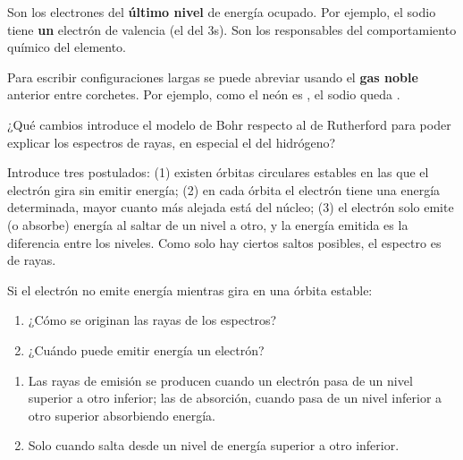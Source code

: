 \begin{definition}
    Son los electrones del \textbf{último nivel} de energía ocupado. Por ejemplo, el sodio tiene \textbf{un} electrón de valencia (el del 3s). Son los responsables del comportamiento químico del elemento.
\end{definition}

\begin{remark}
    Para escribir configuraciones largas se puede abreviar usando el \textbf{gas noble} anterior entre corchetes. Por ejemplo, como el neón es , el sodio queda .
\end{remark}

\begin{exercise}
    ¿Qué cambios introduce el modelo de Bohr respecto al de Rutherford para poder explicar los espectros de rayas, en especial el del hidrógeno?
    \begin{solu}
        Introduce tres postulados: (1) existen órbitas circulares estables en las que el electrón gira sin emitir energía; (2) en cada órbita el electrón tiene una energía determinada, mayor cuanto más alejada está del núcleo; (3) el electrón solo emite (o absorbe) energía al saltar de un nivel a otro, y la energía emitida es la diferencia entre los niveles. Como solo hay ciertos saltos posibles, el espectro es de rayas.
    \end{solu}
\end{exercise}

\begin{exercise}
    Si el electrón no emite energía mientras gira en una órbita estable:
    \begin{enumerate}[label=\alph*)]
        \item ¿Cómo se originan las rayas de los espectros?
        \item ¿Cuándo puede emitir energía un electrón?
    \end{enumerate}
    \begin{solu}
        \begin{enumerate}[label=\alph*)]
            \item Las rayas de emisión se producen cuando un electrón pasa de un nivel superior a otro inferior; las de absorción, cuando pasa de un nivel inferior a otro superior absorbiendo energía.
            \item Solo cuando salta desde un nivel de energía superior a otro inferior.
        \end{enumerate}
    \end{solu}
\end{exercise}

